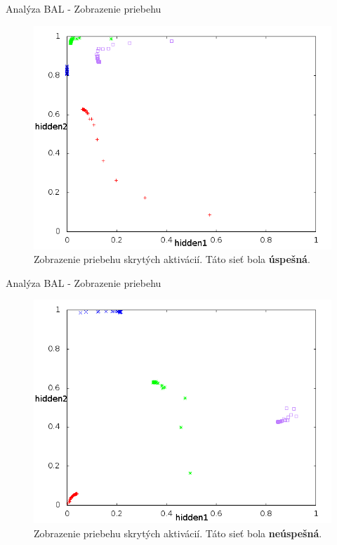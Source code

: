 \documentclass[xcolor=dvipsnames]{beamer}
\begin{document}
\begin{frame}{Analýza BAL - Zobrazenie priebehu}
  \begin{figure}[h!]  
    \centering
    \includegraphics[scale=0.4]{img/left_top.png}
    \caption{{\tiny Zobrazenie priebehu skrytých aktivácií. Táto sieť bola {\bf úspešná}.} }
  \end{figure} 
\end{frame}

\begin{frame}{Analýza BAL - Zobrazenie priebehu}
  \begin{figure}[h!]  
    \centering
    \includegraphics[scale=0.4]{img/tazisko.png}
    \caption{{\tiny Zobrazenie priebehu skrytých aktivácií. Táto sieť bola {\bf neúspešná}.} }
  \end{figure} 
\end{frame}
\end{document}
